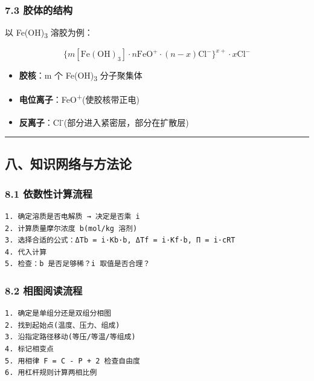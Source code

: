 \subsubsection{7.3 胶体的结构}\label{ux80f6ux4f53ux7684ux7ed3ux6784}

以 Fe(OH)\textsubscript{3} 溶胶为例：

\[
\{m[\mathrm{Fe(OH)_3}] \cdot n\mathrm{FeO^+} \cdot (n-x)\mathrm{Cl^-}\}^{x+} \cdot x\mathrm{Cl^-}
\]

\begin{itemize}
\tightlist
\item
  \textbf{胶核}：m 个 Fe(OH)\textsubscript{3} 分子聚集体
\item
  \textbf{电位离子}：FeO\textsuperscript{+}(使胶核带正电)
\item
  \textbf{反离子}：Cl\textsuperscript{-}(部分进入紧密层，部分在扩散层)
\end{itemize}

\begin{center}\rule{0.5\linewidth}{0.5pt}\end{center}

\subsection{八、知识网络与方法论}\label{ux516bux77e5ux8bc6ux7f51ux7edcux4e0eux65b9ux6cd5ux8bba}

\subsubsection{8.1 依数性计算流程}\label{ux4f9dux6570ux6027ux8ba1ux7b97ux6d41ux7a0b}

\begin{verbatim}
1. 确定溶质是否电解质 → 决定是否乘 i
2. 计算质量摩尔浓度 b(mol/kg 溶剂)
3. 选择合适的公式：ΔTb = i·Kb·b, ΔTf = i·Kf·b, Π = i·cRT
4. 代入计算
5. 检查：b 是否足够稀？i 取值是否合理？
\end{verbatim}

\subsubsection{8.2 相图阅读流程}\label{ux76f8ux56feux9605ux8bfbux6d41ux7a0b}

\begin{verbatim}
1. 确定是单组分还是双组分相图
2. 找到起始点(温度、压力、组成)
3. 沿指定路径移动(等压/等温/等组成)
4. 标记相变点
5. 用相律 F = C - P + 2 检查自由度
6. 用杠杆规则计算两相比例
\end{verbatim}

